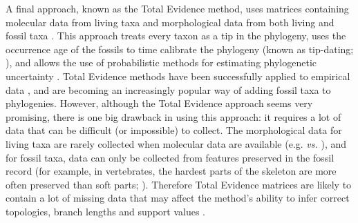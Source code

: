 \documentclass[12pt,letterpaper]{article}
\begin{document}
A final approach, known as the Total Evidence method, uses matrices containing molecular data from living taxa and morphological data from both living and fossil taxa \citep{eernissetaxonomic1993}. This approach treats every taxon as a tip in the phylogeny, uses the occurrence age of the fossils to time calibrate the phylogeny (known as tip-dating; \citealt{ronquista2012}), and allows the use of probabilistic methods for estimating phylogenetic uncertainty \citep{ronquista2012}. Total Evidence methods have been successfully applied to empirical data \citep[e.g.][]{pyrondivergence2011,ronquista2012,schragocombining2013,slaterphylogenetic2013,beckancient2014}, and are becoming an increasingly popular way of adding fossil taxa to phylogenies. However, although the Total Evidence approach seems very promising, there is one big drawback in using this approach: it requires a lot of data that can be difficult (or impossible) to collect. The morphological data for living taxa are rarely collected when molecular data are available (e.g. \citealt{O'Leary08022013} \textit{vs.} \citealt{meredithimpacts2011}), and for fossil taxa, data can only be collected from features preserved in the fossil record (for example, in vertebrates, the hardest parts of the skeleton are more often preserved than soft parts; \citealt{sansomfossilization2013}). Therefore Total Evidence matrices are likely to contain a lot of missing data that may affect the method's ability to infer correct topologies, branch lengths and support values \citep{salamin2003}. 
\end{document}
